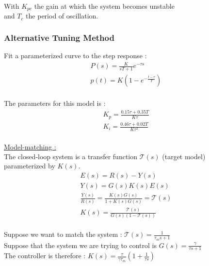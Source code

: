 \documentclass[../main.tex]{subfiles}
\begin{document}
With $K_{pc}$ the gain at which the system becomes unstable\\
and $T_c$ the period of oscillation.\\

\subsubsection{Alternative Tuning Method}
Fit a parameterized curve to the step response :\\
\begin{equation}
\begin{gathered}
    P(s) = \frac{K}{sT+1} e^{-\tau s}\\
    p(t) = K(1-e^{-\frac{t-\tau}{T}})\\
\end{gathered}
\end{equation}

The parameters for this model is : \begin{equation}
    \begin{gathered}
        K_p = \frac{0.15 \tau + 0.35T}{K \tau}\\
        K_i = \frac{0.46 \tau+0.02T}{K \tau^2}\\
    \end{gathered}
\end{equation}

\quad \underline{Model-matching :}\\
The closed-loop system is a transfer function $\mathcal{T}(s)$ (target model) parameterized by $K(s)$.\\
\begin{equation}
    \begin{gathered}
        E(s) = R(s)-Y(s)\\
        Y(s) = G(s) K(s) E(s)\\
        \frac{Y(s)}{R(s)} = \frac{K(s)G(s)}{1+K(s)G(s)} = \mathcal{T}(s)\\
        K(s) = \frac{\mathcal{T}(s)}{G(s)(1-\mathcal{T}(s))}\\
    \end{gathered}
\end{equation}

Suppose we want to match the system : $\mathcal{T}(s) = \frac{1}{\tau_ms+1}$\\
Suppose that the system we are trying to control is $G(s) = \frac{\gamma}{\tau s+1}$\\

The controller is therefore : $K(s) = \frac{\tau}{\gamma\tau_m}(1+\frac{1}{\tau s})$\\
\end{document}
